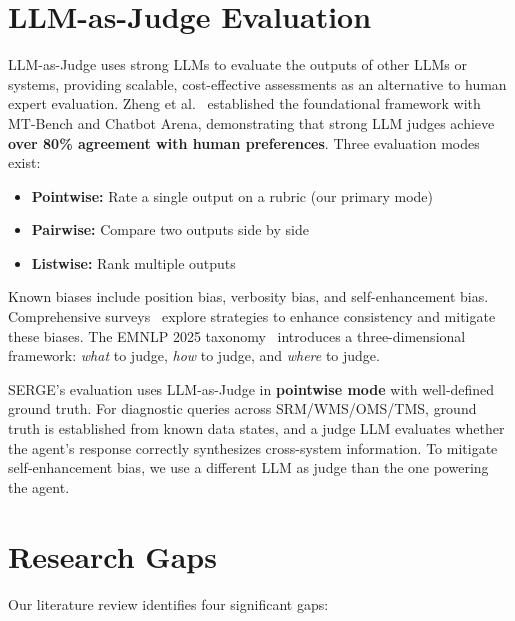 \documentclass[12pt,a4paper]{report}
\begin{document}
\section{LLM-as-Judge Evaluation}

LLM-as-Judge uses strong LLMs to evaluate the outputs of other LLMs or systems, providing scalable, cost-effective assessments as an alternative to human expert evaluation. Zheng et al.~\cite{zheng2023judge} established the foundational framework with MT-Bench and Chatbot Arena, demonstrating that strong LLM judges achieve \textbf{over 80\% agreement with human preferences}. Three evaluation modes exist:

\begin{itemize}[itemsep=0.3em]
    \item \textbf{Pointwise:} Rate a single output on a rubric (our primary mode)
    \item \textbf{Pairwise:} Compare two outputs side by side
    \item \textbf{Listwise:} Rank multiple outputs
\end{itemize}

Known biases include position bias, verbosity bias, and self-enhancement bias. Comprehensive surveys~\cite{gu2024judgesurvey, li2024judgessurvey} explore strategies to enhance consistency and mitigate these biases. The EMNLP 2025 taxonomy~\cite{li2025emnlpjudge} introduces a three-dimensional framework: \textit{what} to judge, \textit{how} to judge, and \textit{where} to judge.

SERGE's evaluation uses LLM-as-Judge in \textbf{pointwise mode} with well-defined ground truth. For diagnostic queries across SRM/WMS/OMS/TMS, ground truth is established from known data states, and a judge LLM evaluates whether the agent's response correctly synthesizes cross-system information. To mitigate self-enhancement bias, we use a different LLM as judge than the one powering the agent.

\section{Research Gaps}

Our literature review identifies four significant gaps:
\end{document}
